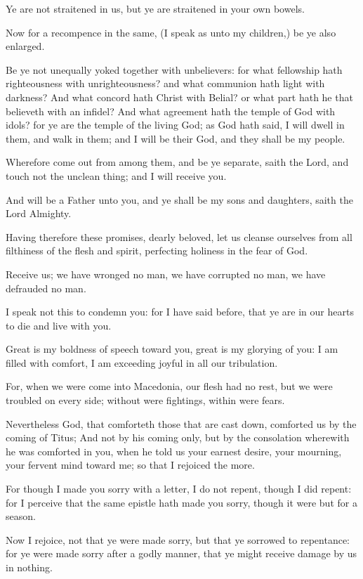 \Verse Ye are not straitened in us, but ye are straitened in your own bowels.

\Verse Now for a recompence in the same, (I speak as unto my children,) be ye also enlarged.

\Verse Be ye not unequally yoked together with unbelievers: for what fellowship hath righteousness with unrighteousness? and what communion hath light with darkness?  \Verse And what concord hath Christ with Belial? or what part hath he that believeth with an infidel?  \Verse And what agreement hath the temple of God with idols? for ye are the temple of the living God; as God hath said, I will dwell in them, and walk in them; and I will be their God, and they shall be my people.

\Verse Wherefore come out from among them, and be ye separate, saith the Lord, and touch not the unclean thing; and I will receive you.

\Verse And will be a Father unto you, and ye shall be my sons and daughters, saith the Lord Almighty.


\Chapter
\Verse Having therefore these promises, dearly beloved, let us cleanse ourselves from all filthiness of the flesh and spirit, perfecting holiness in the fear of God.

\Verse Receive us; we have wronged no man, we have corrupted no man, we have defrauded no man.

\Verse I speak not this to condemn you: for I have said before, that ye are in our hearts to die and live with you.

\Verse Great is my boldness of speech toward you, great is my glorying of you: I am filled with comfort, I am exceeding joyful in all our tribulation.

\Verse For, when we were come into Macedonia, our flesh had no rest, but we were troubled on every side; without were fightings, within were fears.

\Verse Nevertheless God, that comforteth those that are cast down, comforted us by the coming of Titus; \Verse And not by his coming only, but by the consolation wherewith he was comforted in you, when he told us your earnest desire, your mourning, your fervent mind toward me; so that I rejoiced the more.

\Verse For though I made you sorry with a letter, I do not repent, though I did repent: for I perceive that the same epistle hath made you sorry, though it were but for a season.

\Verse Now I rejoice, not that ye were made sorry, but that ye sorrowed to repentance: for ye were made sorry after a godly manner, that ye might receive damage by us in nothing.

